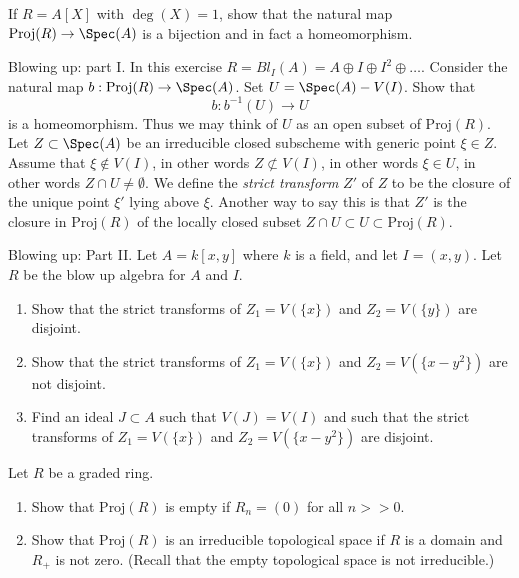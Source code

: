 \begin{exercise}
\label{exercise-iso-polynomial-ring-one-variable}
If $R = A[X]$ with $\deg(X) = 1$, show that the natural map
$\text{Proj}(R) \to \Spec(A)$ is a bijection and in fact
a homeomorphism.
\end{exercise}

\begin{exercise}
\label{exercise-blowing-up-I}
Blowing up: part I.
In this exercise $R = Bl_I(A) = A \oplus I \oplus I^2 \oplus \ldots$.
Consider the natural map $b : \text{Proj}(R) \to \Spec(A)$.
Set $U = \Spec(A) - V(I)$. Show that
$$
b : b^{-1}(U) \longrightarrow U
$$
is a homeomorphism.
Thus we may think of $U$ as an open subset of $\text{Proj}(R)$.
Let $Z \subset \Spec(A)$ be an irreducible closed subscheme
with generic point $\xi \in Z$. Assume that $\xi \not\in V(I)$,
in other words $Z \not\subset V(I)$, in other words
$\xi \in U$, in other words $Z\cap U \not = \emptyset$. We define
the {\it strict transform} $Z'$ of $Z$ to be the closure of the unique
point $\xi'$ lying above $\xi$. Another way to say this is that
$Z'$ is the closure in $\text{Proj}(R)$ of the locally closed subset
$Z\cap U \subset U \subset \text{Proj}(R)$.
\end{exercise}

\begin{exercise}
\label{exercise-blowing-up-II}
Blowing up: Part II.
Let $A = k[x, y]$ where $k$ is a field, and let $I = (x, y)$.
Let $R$ be the blow up algebra for $A$ and $I$.
\begin{enumerate}
\item Show that the strict transforms of $Z_1 = V(\{x\})$ and
$Z_2 = V(\{y\})$ are disjoint.
\item Show that the strict transforms of $Z_1 = V(\{x\})$ and
$Z_2 = V(\{x-y^2\})$ are not disjoint.
\item Find an ideal $J \subset A$ such that $V(J) = V(I)$
and such that the strict transforms of $Z_1 = V(\{x\})$ and
$Z_2 = V(\{x-y^2\})$ are disjoint.
\end{enumerate}
\end{exercise}

\begin{exercise}
\label{exercise-proj-when-empty}
Let $R$ be a graded ring.
\begin{enumerate}
\item Show that $\text{Proj}(R)$ is empty if $R_n = (0)$ for all $n >> 0$.
\item Show that $\text{Proj}(R)$ is an irreducible topological space
if $R$ is a domain and $R_{+}$ is not zero. (Recall that the empty
topological space is not irreducible.)
\end{enumerate}
\end{exercise}

